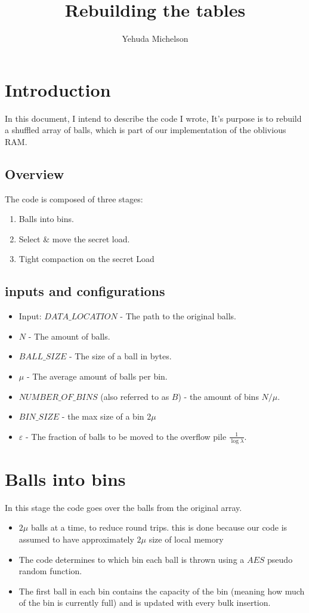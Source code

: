 \documentclass{article}
\title{Rebuilding the tables}
\author{Yehuda Michelson}
\begin{document}
\maketitle

\section{Introduction}
In this document, I intend to describe the code I wrote, It's purpose is to rebuild a shuffled array of balls, which is part of our implementation of the oblivious RAM.
\subsection{Overview}
The code is composed of three stages:
\begin{enumerate}
    \item Balls into bins.
    \item Select \& move the secret load.
    \item Tight compaction on the secret Load
\end{enumerate}
\subsection{inputs and configurations}
\begin{itemize}
    \item Input: $DATA\_LOCATION$ - The path to the original balls.
    \item $N$ - The amount of balls.
    \item $BALL\_SIZE$ - The size of a ball in bytes.
    \item $\mu$ - The average amount of balls per bin.
    \item $NUMBER\_OF\_BINS$ (also referred to as $B$) - the amount of bins $N/\mu$.
    \item $BIN\_SIZE$ - the max size of a bin $2\mu$
    \item $\varepsilon$ - The fraction of balls to be moved to the overflow pile $\frac{1}{\log{\lambda}}$.
\end{itemize}
\section{Balls into bins}
In this stage the code goes over the balls from the original array. 
\begin{itemize}
    \item $2\mu$ balls at a time, to reduce round trips. this is done because our code is assumed to have approximately $2\mu$ size of local memory    
    \item The code determines to which bin each ball is thrown using a $AES$ pseudo random function.
    \item The first ball in each bin contains the capacity of the bin (meaning how much of the bin is currently full) and is updated with every bulk insertion.
\end{itemize}
\end{document}
